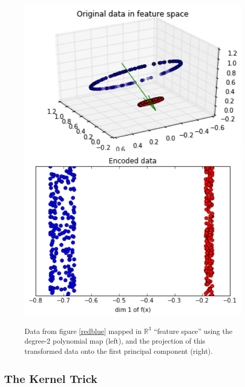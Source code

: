 \documentclass[]{article}
\newcommand{\reals}{\mathbb{R}}
\begin{document}
\begin{figure}[h]
\begin{center}
\includegraphics[scale=0.4]{figures/3d}
\quad \quad
\includegraphics[scale=0.4]{figures/3d_encode}
\caption{Data from figure \ref{redblue} mapped in $\reals^3$ ``feature space'' using the degree-2 polynomial map (left), and the projection of this transformed data onto the first principal component (right). }
\label{redblue-2}
\end{center}
\end{figure}



\subsection{The Kernel Trick}
\end{document}
